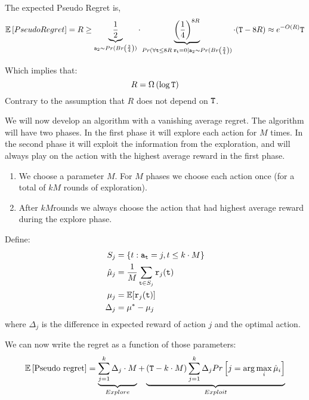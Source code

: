 The expected Pseudo Regret is,
\[
\mathbb{E}\left[Pseudo Regret\right] = R \geq
\underbrace{\frac{1}{2}}_{{\tt a}_{2}\sim Pr(Br\left(\frac{3}{4}\right))}
\cdot \underbrace{\left(\frac{1}{4}\right)^{8R}}_{Pr(\forall {\tt t}\leq 8R \; {\tt r}_{\tt t}= 0 |
{\tt a}_{2}\sim Pr(Br\left(\frac{3}{4}\right))} \cdot ({\tt T} - 8R) \approx
e^{-O(R)}{\tt T}
\]

Which implies that:
\[
R=\Omega\left(\log {\tt T}\right)
\]
Contrary to the assumption that $R$ does not depend on ${\tt T}$.


We will now develop an algorithm with a vanishing average regret. The algorithm will have two phases. In the first phase it will explore each action for $M$ times. In the second phase it will exploit the information from the exploration, and will always play on the action with the highest average reward in the first phase.

\begin{enumerate}
%
\item We choose a parameter $M$.
%
For $M$ phases we choose each action once (for a total of $kM$
rounds of exploration).
%
\item After $kM$rounds we always choose the action that had highest
average reward during the explore phase.
\end{enumerate}

Define:
\begin{align*}
S_{j}&= \left\{ t:{\tt a}_{{\tt t}}=j,t\le k\cdot M\right\}\\
\hat{\mu}_{j}&=\frac{1}{M} \sum_{{\tt t}\in S_{j}}{\tt r}_{j}({\tt t})\\
\mu_{j}&=\mathbb{E}[{\tt r}_{j}({\tt t})]\\
\Delta_{j}&=\mu^{*}-\mu_{j}
\end{align*}
where $\Delta_j$ is the difference in expected reward of action $j$
and the optimal action.

We can now write the regret as a function of those parameters:
\[
\mathbb{E}\left[\text{Pseudo regret}\right]=\underbrace{{\displaystyle
\sum_{j=1}^{k}\Delta_{j}\cdot
M}}_{Explore}+\underbrace{\left({\tt T}-k\cdot M\right){\displaystyle
\sum_{j=1}^{k}\Delta_{j}Pr\left[j=\arg\max_{i}\hat{\mu}_{i}\right]}}_{Exploit}
\]


